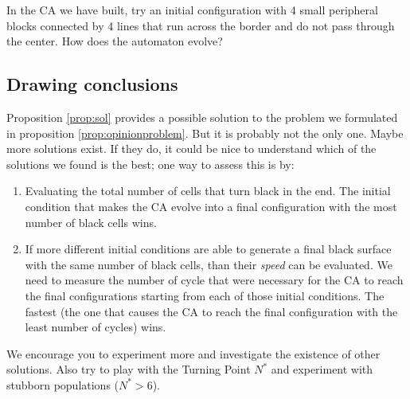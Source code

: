 \begin{problem}
\label{prob:opinionproof1}
In the CA we have built, try an initial configuration with 4 small peripheral blocks connected by 4 lines that
run across the border and do not pass through the center. How does the automaton evolve?
\end{problem}

\subsection{Drawing conclusions}
Proposition \ref{prop:sol} provides a possible solution to the problem we formulated in proposition \ref{prop:opinionproblem}.
But it is probably not the only one. Maybe more solutions exist. If they do, it could be nice to understand which of
the solutions we found is the best; one way to assess this is by:

\begin{enumerate}
\item Evaluating the total number of cells that turn black in the end. The initial condition that makes the CA
evolve into a final configuration with the most number of black cells wins.
\item If more different initial conditions are able to generate a final black surface with the same number of black cells,
than their \textit{speed} can be evaluated. We need to measure the number of cycle that were necessary for the CA to
reach the final configurations starting from each of those initial conditions. 
The fastest (the one that causes the CA to reach
the final configuration with the least number of cycles) wins.
\end{enumerate}

We encourage you to experiment more and investigate the existence of other solutions. Also try to play with the
Turning Point $N^\ast$ and experiment with stubborn populations ($N^\ast > 6$).

